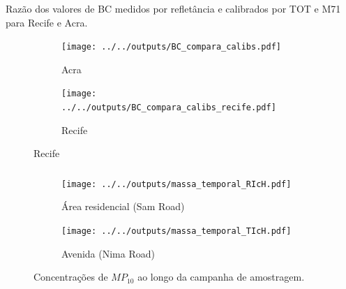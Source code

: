 \begin{frame}
  \frametitle{}
  Razão dos valores de BC medidos por refletância e calibrados por 
  TOT e M71 para Recife e Acra.
  \begin{figure}[H]
  	\centering
  	\begin{subfigure}[b]{0.43\linewidth}
  		\texttt{[image: ../../outputs/BC\_compara\_calibs.pdf]}
  		\caption{Acra}
  	\end{subfigure}
  		\hspace{0.3cm}
  	\begin{subfigure}[b]{0.43\linewidth}
  		\texttt{[image: ../../outputs/BC\_compara\_calibs\_recife.pdf]}
  		\caption{Recife}
  	\end{subfigure}%
   \end{figure}
\end{frame}

\begin{frame}
  \frametitle{}
  \begin{table}[H]
  \centering
  \tiny 
    
  \end{table}
  
  \begin{table}[H]
  \centering
  \tiny 
    
  \end{table}
    \begin{table}[H]
      \centering
      \tiny 
      

    \end{table}
\end{frame}


\begin{frame}
  \frametitle{}
  \begin{figure}[H]
    \centering
    \begin{subfigure}[b]{0.45\textwidth}
      \texttt{[image: ../../outputs/massa\_temporal\_RIcH.pdf]}
      \caption{Área residencial (Sam Road)}
    \end{subfigure}%
    \begin{subfigure}[b]{0.45\textwidth}
      \texttt{[image: ../../outputs/massa\_temporal\_TIcH.pdf]}
      \caption{Avenida (Nima Road)}
    \end{subfigure}
    \caption{Concentrações de $MP_{10}$ ao longo da campanha de amostragem.
             \label{fig:massa_temporal_mp10}}
  \end{figure}
\end{frame}


